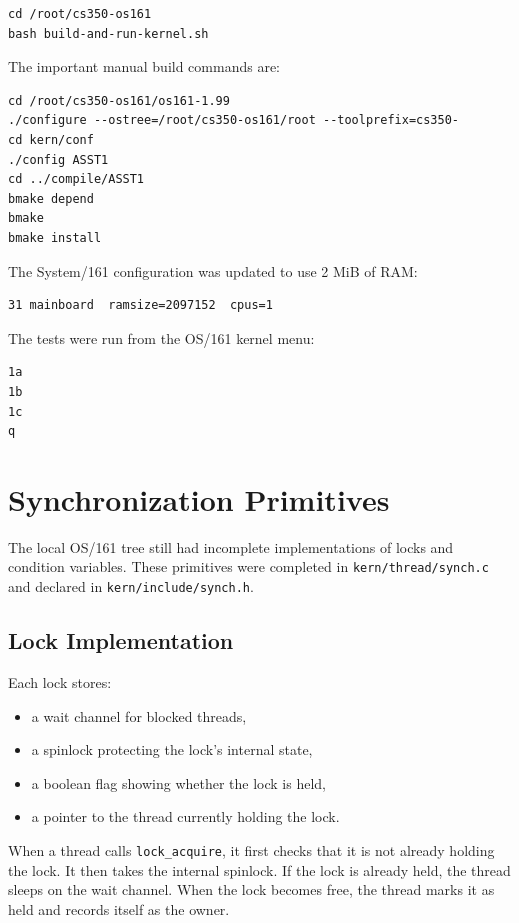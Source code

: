 \documentclass[12pt,a4paper]{article}
\begin{document}
\begin{lstlisting}[style=shellstyle]
cd /root/cs350-os161
bash build-and-run-kernel.sh
\end{lstlisting}

The important manual build commands are:

\begin{lstlisting}[style=shellstyle]
cd /root/cs350-os161/os161-1.99
./configure --ostree=/root/cs350-os161/root --toolprefix=cs350-
cd kern/conf
./config ASST1
cd ../compile/ASST1
bmake depend
bmake
bmake install
\end{lstlisting}

The System/161 configuration was updated to use 2 MiB of RAM:

\begin{lstlisting}[style=shellstyle]
31 mainboard  ramsize=2097152  cpus=1
\end{lstlisting}

The tests were run from the OS/161 kernel menu:

\begin{lstlisting}[style=shellstyle]
1a
1b
1c
q
\end{lstlisting}

\section{Synchronization Primitives}

The local OS/161 tree still had incomplete implementations of locks and
condition variables. These primitives were completed in
\texttt{kern/thread/synch.c} and declared in \texttt{kern/include/synch.h}.

\subsection{Lock Implementation}

Each lock stores:

\begin{itemize}
    \item a wait channel for blocked threads,
    \item a spinlock protecting the lock's internal state,
    \item a boolean flag showing whether the lock is held,
    \item a pointer to the thread currently holding the lock.
\end{itemize}

When a thread calls \texttt{lock\_acquire}, it first checks that it is not
already holding the lock. It then takes the internal spinlock. If the lock is
already held, the thread sleeps on the wait channel. When the lock becomes
free, the thread marks it as held and records itself as the owner.
\end{document}
